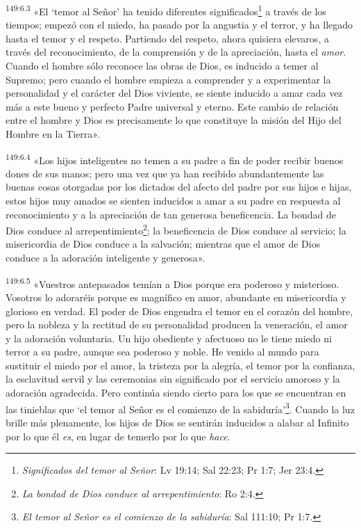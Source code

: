 \par
\textsuperscript{149:6.3} «El `temor al Señor' ha tenido diferentes significados\footnote{\textit{Significados del temor al Señor}: Lv 19:14; Sal 22:23; Pr 1:7; Jer 23:4.} a través de los tiempos; empezó con el miedo, ha pasado por la angustia y el terror, y ha llegado hasta el temor y el respeto. Partiendo del respeto, ahora quisiera elevaros, a través del reconocimiento, de la comprensión y de la apreciación, hasta el \textit{amor}. Cuando el hombre sólo reconoce las obras de Dios, es inducido a temer al Supremo; pero cuando el hombre empieza a comprender y a experimentar la personalidad y el carácter del Dios viviente, se siente inducido a amar cada vez más a este bueno y perfecto Padre universal y eterno. Este cambio de relación entre el hombre y Dios es precisamente lo que constituye la misión del Hijo del Hombre en la Tierra».

\par
\textsuperscript{149:6.4} «Los hijos inteligentes no temen a su padre a fin de poder recibir buenos dones de sus manos; pero una vez que ya han recibido abundantemente las buenas cosas otorgadas por los dictados del afecto del padre por sus hijos e hijas, estos hijos muy amados se sienten inducidos a amar a su padre en respuesta al reconocimiento y a la apreciación de tan generosa beneficencia. La bondad de Dios conduce al arrepentimiento\footnote{\textit{La bondad de Dios conduce al arrepentimiento}: Ro 2:4.}; la beneficencia de Dios conduce al servicio; la misericordia de Dios conduce a la salvación; mientras que el amor de Dios conduce a la adoración inteligente y generosa».

\par
\textsuperscript{149:6.5} «Vuestros antepasados temían a Dios porque era poderoso y misterioso. Vosotros lo adoraréis porque es magnífico en amor, abundante en misericordia y glorioso en verdad. El poder de Dios engendra el temor en el corazón del hombre, pero la nobleza y la rectitud de su personalidad producen la veneración, el amor y la adoración voluntaria. Un hijo obediente y afectuoso no le tiene miedo ni terror a su padre, aunque sea poderoso y noble. He venido al mundo para sustituir el miedo por el amor, la tristeza por la alegría, el temor por la confianza, la esclavitud servil y las ceremonias sin significado por el servicio amoroso y la adoración agradecida. Pero continúa siendo cierto para los que se encuentran en las tinieblas que `el temor al Señor es el comienzo de la sabiduría'\footnote{\textit{El temor al Señor es el comienzo de la sabiduría}: Sal 111:10; Pr 1:7.}. Cuando la luz brille más plenamente, los hijos de Dios se sentirán inducidos a alabar al Infinito por lo que él \textit{es}, en lugar de temerlo por lo que \textit{hace}.

